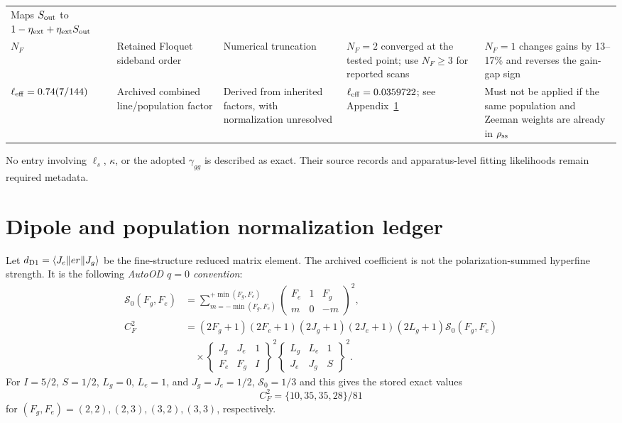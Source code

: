 \documentclass[11pt,a4paper]{article}
\begin{document}
\begin{longtable}{L{2.8cm}L{3.4cm}L{2.5cm}L{3.4cm}L{3.4cm}}
Maps $S_{\rm out}$ to $1-\eta_{\rm ext}+\eta_{\rm ext}S_{\rm out}$\\
$N_F$ &
Retained Floquet sideband order &
Numerical truncation &
$N_F=2$ converged at the tested point; use $N_F\geq3$ for reported scans &
$N_F=1$ changes gains by 13--17\% and reverses the gain-gap sign\\
$\ell_{\rm eff}=0.74(7/144)$ &
Archived combined line/population factor &
Derived from inherited factors, with normalization unresolved &
$\ell_{\rm eff}=0.0359722$; see Appendix~\ref{app:normalization} &
Must not be applied if the same population and Zeeman weights are already in
$\rho_{\rm ss}$\\
\bottomrule
\end{longtable}
\endgroup

No entry involving $\ell_s$, $\kappa$, or the adopted $\gamma_{gg}$ is
described as exact. Their source records and apparatus-level fitting
likelihoods remain required metadata.

\section{Dipole and population normalization ledger}
\label{app:normalization}

Let $d_{\rm D1}=\langle J_e\|er\|J_g\rangle$ be the fine-structure reduced
matrix element. The archived coefficient is not the polarization-summed
hyperfine strength. It is the following \emph{AutoOD $q=0$ convention}:
\begin{align}
\mathcal S_0(F_g,F_e)
&=\sum_{m=-\min(F_g,F_e)}^{+\min(F_g,F_e)}
\begin{pmatrix}F_e&1&F_g\\m&0&-m\end{pmatrix}^{\!2},\\
C_F^2&=(2F_g+1)(2F_e+1)(2J_g+1)(2J_e+1)(2L_g+1)
\mathcal S_0(F_g,F_e)\nonumber\\
&\quad\times
\begin{Bmatrix}J_g&J_e&1\\F_e&F_g&I\end{Bmatrix}^{\!2}
\begin{Bmatrix}L_g&L_e&1\\J_e&J_g&S\end{Bmatrix}^{\!2}.
\label{eq:CF-normalization}
\end{align}
For $I=5/2$, $S=1/2$, $L_g=0$, $L_e=1$, and
$J_g=J_e=1/2$, $\mathcal S_0=1/3$ and this gives the stored exact values
\[
C_F^2=\{10,35,35,28\}/81
\]
for $(F_g,F_e)=(2,2),(2,3),(3,2),(3,3)$, respectively.
\end{document}

